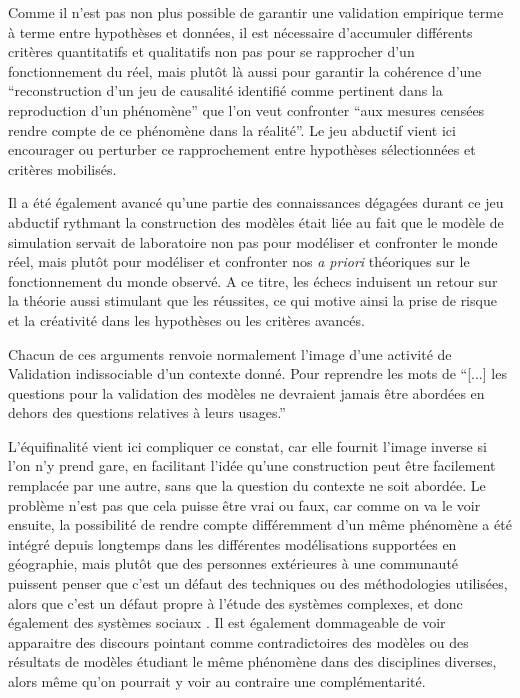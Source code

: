 Comme il n'est pas non plus possible de garantir une validation empirique terme à terme entre hypothèses et données, il est nécessaire d'accumuler différents critères quantitatifs et qualitatifs non pas pour se rapprocher d'un fonctionnement du réel, mais plutôt là aussi pour garantir la cohérence d'une \enquote{reconstruction d'un jeu de causalité identifié comme pertinent dans la reproduction d'un phénomène} que l'on veut confronter \enquote{aux mesures censées rendre compte de ce phénomène dans la réalité}. Le jeu abductif vient ici encourager ou perturber ce rapprochement entre hypothèses sélectionnées et critères mobilisés.

Il a été également avancé qu'une partie des connaissances dégagées durant ce jeu abductif rythmant la construction des modèles était liée au fait que le modèle de simulation servait de laboratoire non pas pour modéliser et confronter le monde réel, mais plutôt pour modéliser et confronter nos \textit{a priori} théoriques sur le fonctionnement du monde observé. A ce titre, les échecs induisent un retour sur la théorie aussi stimulant que les réussites, ce qui motive ainsi la prise de risque et la créativité dans les hypothèses ou les critères avancés.

Chacun de ces arguments renvoie normalement l'image d'une activité de Validation indissociable d'un contexte donné. Pour reprendre les mots de \textcite{Amblard2006} \enquote{[...] les questions pour la validation des modèles ne devraient jamais être abordées en dehors des questions relatives à leurs usages.}

L'équifinalité vient ici compliquer ce constat, car elle fournit l'image inverse si l'on n'y prend gare, en facilitant l'idée qu'une construction peut être facilement remplacée par une autre, sans que la question du contexte ne soit abordée. Le problème n'est pas que cela puisse être vrai ou faux, car comme on va le voir ensuite, la possibilité de rendre compte différemment d'un même phénomène a été intégré depuis longtemps dans les différentes modélisations supportées en géographie, mais plutôt que des personnes extérieures à une communauté puissent penser que c'est un défaut des techniques ou des méthodologies utilisées, alors que c'est un défaut propre à l'étude des systèmes complexes, et donc également des systèmes sociaux \autocite{Elsenbroich2012}. Il est également dommageable de voir apparaitre des discours pointant comme contradictoires des modèles ou des résultats de modèles étudiant le même phénomène dans des disciplines diverses, alors même qu'on pourrait y voir au contraire une complémentarité.

